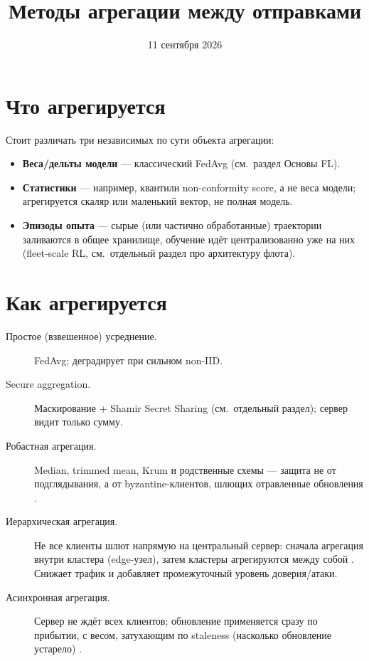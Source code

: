 \documentclass[11pt]{article}
\title{Методы агрегации между отправками}
\author{}
\date{11 сентября 2026}
\begin{document}
\maketitle

\section{Что агрегируется}

Стоит различать три независимых по сути объекта агрегации:
\begin{itemize}
  \item \textbf{Веса/дельты модели} — классический FedAvg
        (см.\ раздел \guillemotleft Основы FL\guillemotright).
  \item \textbf{Статистики} — например, квантили non-conformity score, а не веса
        модели; агрегируется скаляр или маленький вектор, не полная модель.
  \item \textbf{Эпизоды опыта} — сырые (или частично обработанные) траектории
        заливаются в общее хранилище, обучение идёт централизованно уже на них
        (fleet-scale RL, см.\ отдельный раздел про архитектуру флота).
\end{itemize}

\section{Как агрегируется}

\begin{description}
  \item[Простое (взвешенное) усреднение.] FedAvg; деградирует при сильном non-IID.
  \item[Secure aggregation.] Маскирование + Shamir Secret Sharing
        \cite{bonawitz2017} (см.\ отдельный раздел); сервер видит только сумму.
  \item[Робастная агрегация.] Median, trimmed mean, Krum и родственные схемы —
        защита не от подглядывания, а от byzantine-клиентов, шлющих отравленные
        обновления \cite{sable2023}.
  \item[Иерархическая агрегация.] Не все клиенты шлют напрямую на центральный сервер:
        сначала агрегация внутри кластера (edge-узел), затем кластеры агрегируются
        между собой \cite{asynchierarchical2022, ageofconvergence2023}. Снижает
        трафик и добавляет промежуточный уровень доверия/атаки.
  \item[Асинхронная агрегация.] Сервер не ждёт всех клиентов; обновление применяется
        сразу по прибытии, с весом, затухающим по staleness (насколько обновление
        \guillemotleft устарело\guillemotright) \cite{asyncsurvey2021}.
\end{description}
\end{document}
